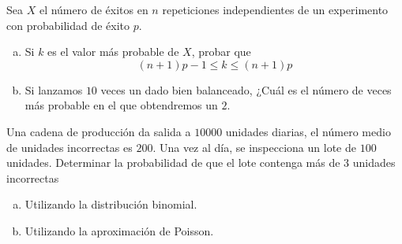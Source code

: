 \documentclass[12pt]{article}
\begin{document}

\probl   Sea $X$ el número de éxitos en $n$ repeticiones independientes de un experimento
con probabilidad de éxito $p$.
\begin{enumerate}[a)]
\item  Si $k$ es el valor más probable de $X$, probar que
 $$(n+1)p - 1 \leq k \leq (n+1)p$$
\item  Si lanzamos $10$ veces un dado bien balanceado, ¿Cuál es el número de veces más probable
en el que obtendremos un $2$.
\end{enumerate}

\probl  Una cadena de producción da salida a $10000$ unidades diarias,  el número medio de
unidades incorrectas es $200$. Una vez al día, se inspecciona un lote de $100$ unidades.
Determinar la probabilidad de que el lote contenga más de $3$ unidades incorrectas
\begin{enumerate}[a)]
\item Utilizando la distribución binomial.
\item Utilizando la aproximación de Poisson.
\end{enumerate}
\end{document}
